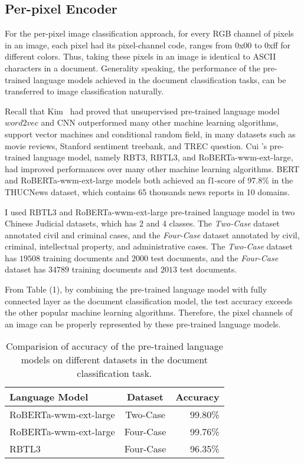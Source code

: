 \documentclass[review]{cvpr}
\begin{document}
\subsection{Per-pixel Encoder}

For the per-pixel image classification approach, for every RGB channel of pixels in an image,
each pixel had its pixel-channel code, ranges from 0x00 to 0xff for different colors.
Thus, taking these pixels in an image is identical to ASCII characters in a document.
Generality speaking, the performance of the pre-trained language models achieved in the document classification tasks, can be transferred to image classification naturally.

Recall that Kim~\cite{kim2014convolutional} had proved that unsupervised pre-trained language model $word2vec$ and CNN outperformed many other machine learning algorithms,
\eg support vector machines and conditional random field, in many datasets such as movie reviews, Stanford sentiment treebank, and TREC question.
Cui \etal's pre-trained language model, namely RBT3, RBTL3, and RoBERTa-wwm-ext-large, had improved performances over many other machine learning algorithms.
BERT and RoBERTa-wwm-ext-large models both achieved an f1-score of 97.8\% in the THUCNews dataset, which contains 65 thousands news reports in 10 domains.

I used RBTL3 and RoBERTa-wwm-ext-large pre-trained language model in two Chinese Judicial datasets, which has 2 and 4 classes.
The \textit{Two-Case} dataset annotated civil and criminal cases, and the \textit{Four-Case} dataset annotated by civil, criminal, intellectual property, and administrative cases.
The \textit{Two-Case} dataset has $19508$ training documents and $2000$ test documents, and the \textit{Four-Case} dataset has $34789$ training documents and $2013$ test documents.

From Table (1), by combining the pre-trained language model with fully connected layer as the document classification model,
the test accuracy exceeds the other popular machine learning algorithms.
Therefore, the pixel channels of an image can be properly represented by these pre-trained language models.

\begin{table}
\begin{center}
\begin{tabular}{|l|c|r|}
\hline
Language Model 	& Dataset & Accuracy \\
\hline\hline
RoBERTa-wwm-ext-large & Two-Case	&	99.80\% \\
RoBERTa-wwm-ext-large & Four-Case	&	99.76\% \\
RBTL3  & Four-Case	&	96.35\% \\
\hline
\end{tabular}
\end{center}
\caption{Comparision of accuracy of the pre-trained language models on different datasets in the document classification task.}
\end{table}
\end{document}
